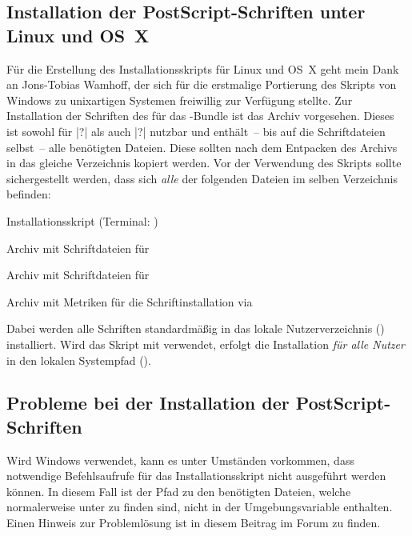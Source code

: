 \subsection{Installation der PostScript-Schriften unter Linux und OS~X}
%
%
Für die Erstellung des Installationsskripts für Linux und OS~X geht mein Dank 
an Jons-Tobias Wamhoff, der sich für die erstmalige Portierung des Skripts 
von Windows zu unixartigen Systemen freiwillig zur Verfügung stellte.
Zur Installation der Schriften des \CDs für das \TUDScript-Bundle ist das Archiv
%
{} vorgesehen. Dieses ist sowohl für 
|?| als auch |?| 
nutzbar und enthält~-- bis auf die Schriftdateien selbst~-- alle benötigten 
Dateien. Diese sollten nach dem Entpacken des Archivs in das gleiche 
Verzeichnis kopiert werden. Vor der Verwendung des Skripts 
 sollte sichergestellt werden, dass sich 
\emph{alle} der folgenden Dateien im selben Verzeichnis befinden:
%
\settowidth{}%
\begin{description}[labelwidth=\tempdim,labelsep=1em]
  \item[\File{tudscrfonts\_install.sh}]Installationsskript
    (Terminal: )
  \item[\File{Univers\_PS.zip}]Archiv mit Schriftdateien für \Univers
  \item[\File{DIN\_Bd\_PS.zip}]Archiv mit Schriftdateien für \DIN
  \item[\File{tudscr\_fonts\_install.zip}]Archiv mit Metriken für die
    Schriftinstallation via 
\end{description}
%
Dabei werden alle Schriften standardmäßig in das lokale Nutzerverzeichnis 
() installiert. Wird das Skript mit  verwendet, 
erfolgt die Installation \emph{für alle Nutzer} in den lokalen Systempfad 
().



\subsection*{Probleme bei der Installation der PostScript-Schriften}
%
Wird Windows verwendet, kann es unter Umständen vorkommen, dass notwendige 
Befehlsaufrufe für das Installationsskript nicht ausgeführt werden können. In 
diesem Fall ist der Pfad zu den benötigten Dateien, welche normalerweise unter 
 zu finden sind, nicht in der 
Umgebungsvariable  enthalten. Einen Hinweis zur Problemlösung ist 
%
{in diesem Beitrag im Forum} zu finden.

